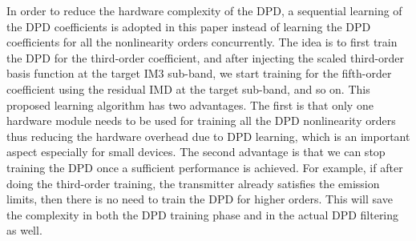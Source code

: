 In order to reduce the hardware complexity of the DPD, a sequential learning of the DPD coefficients is adopted in this paper instead of learning the DPD coefficients for all the nonlinearity orders concurrently. 
The idea is to first train the DPD for the third-order coefficient, and after injecting the scaled third-order basis function at the target IM3 sub-band, we start training for the fifth-order coefficient using the residual IMD at the target sub-band, and so on. 
This proposed learning algorithm has two advantages. 
The first is that only one hardware module needs to be used for training all the DPD nonlinearity orders thus reducing the hardware overhead due to DPD learning, which is an important aspect especially for small devices. 
The second advantage is that we can stop training the DPD once a sufficient performance is achieved. 
For example, if after doing the third-order training, the transmitter already satisfies the emission limits, then there is no need to train the DPD for higher orders. 
This will save the complexity in both the DPD training phase and in the actual DPD filtering as well.

